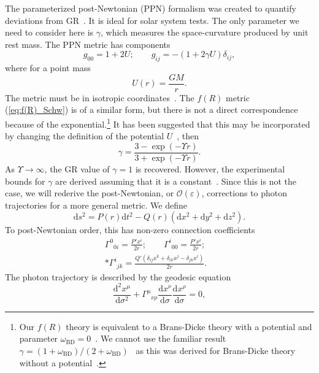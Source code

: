 \documentclass[aps,prd,amsfonts,amssymb,amsmath,nofootinbib,reprint,showpacs]{revtex4-1}
\newcommand{\eqnref}[1]{(\ref{eq:#1})}
\newcommand{\sub}[1]{\ensuremath{_\text{#1}}}
\newcommand{\dd}{\ensuremath{\text{d}}}
\newcommand{\diff}[2]{\ensuremath{\frac{\dd {#1}}{\dd {#2}}}}
\newcommand{\difftwo}[2]{\ensuremath{\frac{\dd^2 {#1}}{\dd {#2}^2}}}
\newcommand{\order}[1]{\ensuremath{\mathcal{O}({#1})}}
\begin{document}
The parameterized post-Newtonian (PPN) formalism was created to quantify deviations from GR~\cite{Will1993, Will2006}. It is ideal for solar system tests. The only parameter we need to consider here is $\gamma$, which measures the space-curvature produced by unit rest mass. The PPN metric has components
\begin{equation}
g_{00} = 1 + 2U; \qquad g_{ij} = -(1 + 2\gamma U)\delta_{ij},
\end{equation}
where for a point mass
\begin{equation}
U(r) = \frac{GM}{r}.
\end{equation}
The metric must be in isotropic coordinates~\cite{Misner1973,Will1993}. The $f(R)$ metric \eqnref{f(R)_Schw} is of a similar form, but there is not a direct correspondence because of the exponential.\footnote{Our $f(R)$ theory is equivalent to a Brans-Dicke theory with a potential and parameter $\omega\sub{BD} = 0$~\cite{Teyssandier1983, Wands1994}. We cannot use the familiar result $\gamma = (1 + \omega\sub{BD})/(2 + \omega\sub{BD})$~\cite{Will2006} as this was derived for Brans-Dicke theory without a potential~\cite{Will1993}.} It has been suggested that this may be incorporated by changing the definition of the potential $U$~\cite{Olmo2007c, Faulkner2007, Bisabr2010, DeFelice2010}, then
\begin{equation}
\gamma = \frac{3 - \exp(-\Upsilon r)}{3 + \exp(-\Upsilon r)}.
\end{equation}
As $\Upsilon \rightarrow \infty$, the GR value of $\gamma = 1$ is recovered. However, the experimental bounds for $\gamma$ are derived assuming that it is a constant~\cite{Will1993}. Since this is not the case, we will rederive the post-Newtonian, or $\order{\varepsilon}$, corrections to photon trajectories for a more general metric. We define
\begin{equation}
\dd s^2 = P(r)\dd t^2 - Q(r)\left(\dd x^2 + \dd y^2 + \dd z^2\right).
\end{equation}
To post-Newtonian order, this has non-zero connection coefficients
\begin{equation}
\begin{split}
{\Gamma^0}_{0i} = \frac{P'x^i}{2r}; \qquad {\Gamma^i}_{00} = \frac{P'x^i}{2r}; \quad\\*
{\Gamma^i}_{jk} = \frac{Q'(\delta_{ij}x^k + \delta_{ik}x^j-\delta_{jk}x^i)}{2r}.
\end{split}
\end{equation}
The photon trajectory is described by the geodesic equation
\begin{equation}
\difftwo{x^\mu}{\sigma} + {\Gamma^\mu}_{\nu\rho}\diff{x^\nu}{\sigma}\diff{x^\rho}{\sigma} = 0,
\label{eq:Geodesic}
\end{equation}
\end{document}

